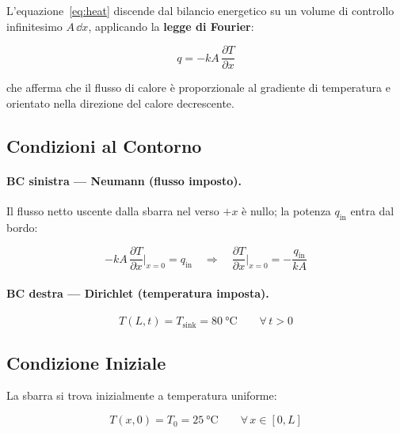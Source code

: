 \documentclass[11pt, a4paper]{article}
\begin{document}
L'equazione~\eqref{eq:heat} discende dal bilancio energetico su un volume di controllo infinitesimo $A\,\dd x$, applicando la \textbf{legge di Fourier}:

\begin{equation}
  q = -k A \, \frac{\partial T}{\partial x}
  \label{eq:fourier}
\end{equation}

che afferma che il flusso di calore è proporzionale al gradiente di temperatura e orientato nella direzione del calore decrescente.

\subsection{Condizioni al Contorno}

\paragraph{BC sinistra — Neumann (flusso imposto).}
Il flusso netto uscente dalla sbarra nel verso $+x$ è nullo; la potenza $q_\text{in}$ entra dal bordo:

\begin{equation}
  -k A \, \frac{\partial T}{\partial x}\bigg|_{x=0} = q_\text{in}
  \quad \Longrightarrow \quad
  \frac{\partial T}{\partial x}\bigg|_{x=0} = -\frac{q_\text{in}}{k A}
  \label{eq:BC_neumann}
\end{equation}

\paragraph{BC destra — Dirichlet (temperatura imposta).}

\begin{equation}
  T(L, t) = T_\text{sink} = \SI{80}{\celsius} \qquad \forall\, t > 0
  \label{eq:BC_dirichlet}
\end{equation}

\subsection{Condizione Iniziale}

La sbarra si trova inizialmente a temperatura uniforme:

\begin{equation}
  T(x, 0) = T_0 = \SI{25}{\celsius} \qquad \forall\, x \in [0, L]
  \label{eq:IC}
\end{equation}

\end{document}

